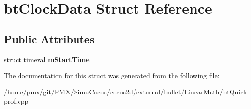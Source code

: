 \hypertarget{structbtClockData}{}\section{bt\+Clock\+Data Struct Reference}
\label{structbtClockData}
\subsection*{Public Attributes}
\begin{DoxyCompactItemize}
\item 
\mbox{\label{structbtClockData_a1fec47321c4890e5ea9f48743c7007e0}} 
struct timeval {\bfseries m\+Start\+Time}
\end{DoxyCompactItemize}


The documentation for this struct was generated from the following file\+:\begin{DoxyCompactItemize}
\item 
/home/pmx/git/\+P\+M\+X/\+Simu\+Cocos/cocos2d/external/bullet/\+Linear\+Math/bt\+Quickprof.\+cpp\end{DoxyCompactItemize}
